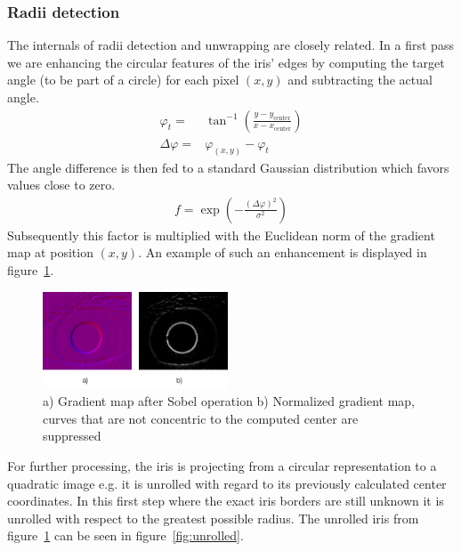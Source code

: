 \documentclass[journal]{IEEEtran}
\begin{document}
\subsubsection{Radii detection}
The internals of radii detection and unwrapping are closely related. In a first pass we are enhancing the circular features of the iris' edges by computing the target angle (to be part of a circle) for each pixel $(x,y)$ and subtracting the actual angle.
\begin{align*}
	\varphi_t =& \tan^{-1}\left(\frac{y - y_{\text{center}}}{x - x_{\text{center}}}\right) \\
	\Delta \varphi =& \varphi_{(x,y)} - \varphi_t
\end{align*}
The angle difference is then fed to a standard Gaussian distribution which favors values close to zero.
\begin{align*}
	f = \exp\left(-\frac{(\Delta \varphi)^2}{\sigma^2}\right)
\end{align*}
Subsequently this factor is multiplied with the Euclidean norm of the gradient map at position $(x,y)$. An example of such an enhancement is displayed in figure~\ref{fig:sobel_norm}.
\begin{figure}[ht]
	\centering
  \includegraphics[width=0.49\textwidth]{iris/sobel_norm.png}
	\caption{a) Gradient map after Sobel operation b) Normalized gradient map, curves that are not concentric to the computed center are suppressed}
	\label{fig:sobel_norm}
\end{figure}
For further processing, the iris is projecting from a circular representation to a quadratic image e.g. it is unrolled with regard to its previously calculated center coordinates. In this first step where the exact iris borders are still unknown it is unrolled with respect to the greatest possible radius. The unrolled iris from figure~\ref{fig:sobel_norm} can be seen in figure~\ref{fig:unrolled}. 
\end{document}
